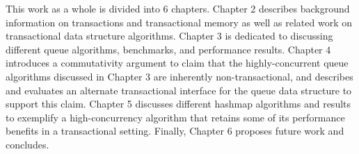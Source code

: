This work as a whole is divided into 6 chapters. Chapter 2 describes background information on transactions and transactional memory as well as related work on transactional data structure algorithms. Chapter 3 is dedicated to discussing different queue algorithms, benchmarks, and performance results. Chapter 4 introduces a commutativity argument to claim that the highly-concurrent queue algorithms discussed in Chapter 3 are inherently non-transactional, and describes and evaluates an alternate transactional interface for the queue data structure to support this claim. Chapter 5 discusses different hashmap algorithms and results to exemplify a high-concurrency algorithm that retains some of its performance benefits in a transactional setting. Finally, Chapter 6 proposes future work and concludes.
